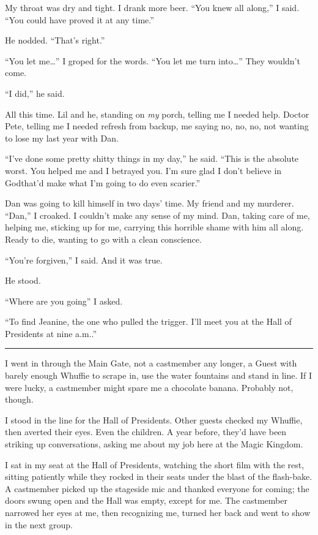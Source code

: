 My throat was dry and tight. I drank more beer. “You knew all
along,” I said. “You could have proved it at any time.”

He nodded. “That's right.”

“You let me…” I groped for the words. “You let me turn into…” They
wouldn't come.

“I did,” he said.

All this time. Lil and he, standing on \emph{my} porch, telling me
I needed help. Doctor Pete, telling me I needed refresh from
backup, me saying no, no, no, not wanting to lose my last year with
Dan.

“I've done some pretty shitty things in my day,” he said. “This is
the absolute worst. You helped me and I betrayed you. I'm sure glad
I don't believe in God{\dash}that'd make what I'm going to do even
scarier.”

Dan was going to kill himself in two days' time. My friend and my
murderer. “Dan,” I croaked. I couldn't make any sense of my mind.
Dan, taking care of me, helping me, sticking up for me, carrying
this horrible shame with him all along. Ready to die, wanting to go
with a clean conscience.

“You're forgiven,” I said. And it was true.

He stood.

“Where are you going” I asked.

“To find Jeanine, the one who pulled the trigger. I'll meet you at
the Hall of Presidents at nine a.m..”

\begin{center}\rule{1in}{0.4pt}\end{center}

I went in through the Main Gate, not a castmember any longer, a
Guest with barely enough Whuffie to scrape in, use the water
fountains and stand in line. If I were lucky, a castmember might
spare me a chocolate banana. Probably not, though.

I stood in the line for the Hall of Presidents. Other guests
checked my Whuffie, then averted their eyes. Even the children. A
year before, they'd have been striking up conversations, asking me
about my job here at the Magic Kingdom.

I sat in my seat at the Hall of Presidents, watching the short film
with the rest, sitting patiently while they rocked in their seats
under the blast of the flash-bake. A castmember picked up the
stageside mic and thanked everyone for coming; the doors swung open
and the Hall was empty, except for me. The castmember narrowed her
eyes at me, then recognizing me, turned her back and went to show
in the next group.

